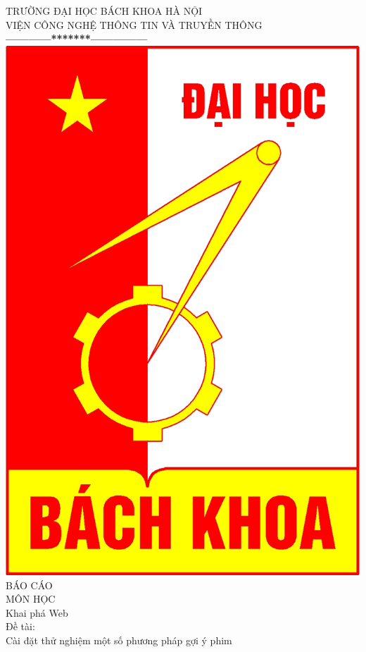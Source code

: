 \documentclass[a4paper,11pt]{report}
\begin{document}
\thispagestyle{empty}
\thisfancypage{
\setlength{\fboxrule}{1pt}
\doublebox}{}
\begin{center}
{\fontsize{16}{19}\selectfont TRƯỜNG ĐẠI HỌC BÁCH KHOA HÀ NỘI\\
VIỆN CÔNG NGHỆ THÔNG TIN VÀ TRUYỀN THÔNG}\\
\textbf{------------*******---------------}\\[1cm]
\includegraphics[scale=0.13]{hust.jpg}\\[1.3cm]

{\fontsize{32}{43}\selectfont BÁO CÁO}\\[0.1cm]
{\fontsize{38}{45}\selectfont MÔN HỌC}\\[0.2cm]
{\fontsize{19}{20}\selectfont Khai phá Web}\\[1cm]
{\fontsize{17}{24}\selectfont Đề tài:}\\[1cm]
{\fontsize{17}{24}\selectfont Cài đặt thử nghiệm một số phương pháp gợi ý phim }\\[2cm]
\end{center}
\end{document}
